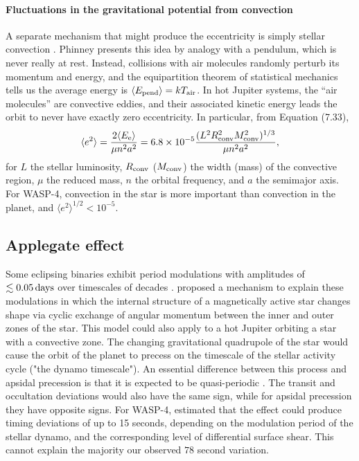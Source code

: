 \documentclass[12pt,twocolumn,tighten]{aastex62}
\begin{document}
\paragraph{Fluctuations in the gravitational potential from convection}
A separate mechanism that might produce the eccentricity is simply
stellar convection \citep[][Section 7]{phinney_pulsars_1992}.  Phinney
presents this idea by analogy with a pendulum, which is never really
at rest. Instead, collisions with air molecules randomly perturb its
momentum and energy, and the equipartition theorem of statistical
mechanics tells us the average energy is $\langle E_{\rm pend} \rangle
= k T_{\rm air}$.  In hot Jupiter systems, the ``air molecules'' are
convective eddies, and their associated kinetic energy leads the orbit
to never have exactly zero eccentricity.  In particular, from
\citealt{phinney_pulsars_1992} Equation (7.33),
\begin{equation}
  \langle e^2 \rangle =
  \frac{ 2 \langle E_{\rm e} \rangle }{\mu n^2 a^2}
  = 6.8\times10^{-5}
  \frac{(L^2 R_{\rm conv}^2 M_{\rm conv}^2)^{1/3}}{\mu n^2 a^2},
\end{equation}
for $L$ the stellar luminosity, $R_{\rm conv}$ ($M_{\rm conv}$) the
width (mass) of the convective region,  $\mu$ the reduced mass, $n$
the orbital frequency, and $a$ the semimajor axis.  For WASP-4,
convection in the star is more important than convection in the
planet, and $\langle e^2 \rangle^{1/2} < 10^{-5}$.


\subsection{Applegate effect}
Some eclipsing binaries exhibit period modulations with amplitudes of
$\lesssim 0.05\,{\rm days}$ over timescales of decades \citep[{\it
e.g.},][]{soderhjelm_geometry_1980,hall_relation_1989}.
\citet{applegate_mechanism_1992} proposed a mechanism to explain these
modulations in which the internal structure of a magnetically active
star changes shape via cyclic exchange of angular momentum between the
inner and outer zones of the star.  This model could also apply to a
hot Jupiter orbiting a star with a convective zone.  The changing
gravitational quadrupole of the star would cause the orbit of the
planet to precess on the timescale of the stellar activity cycle ("the
dynamo timescale").  An essential difference between this process and
apsidal precession is that it is expected to be quasi-periodic
\citep[{\it e.g.},][Figure~12]{soderhjelm_geometry_1980}.  The transit
and occultation deviations would also have the same sign, while for
apsidal precession they have opposite signs.  For WASP-4,
\citet{watson_orbital_2010} estimated that the effect could produce
timing deviations of up to 15 seconds, depending on the modulation
period of the stellar dynamo, and the corresponding level of
differential surface shear.  This cannot explain the majority our
observed $78$ second variation.
\end{document}
